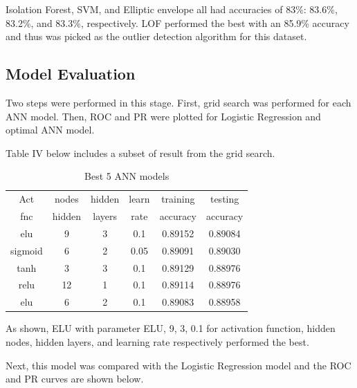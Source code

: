 \documentclass[letterpaper, 12 pt, conference]{ieeeconf}  %
\begin{document}
Isolation Forest, SVM, and Elliptic envelope all had accuracies of 83\%: 83.6\%, 83.2\%, and 83.3\%, respectively. LOF performed the best with an 85.9\% accuracy and thus was picked as the outlier detection algorithm for this dataset. 

\subsection{Model Evaluation}

Two steps were performed in this stage. First, grid search was performed for each ANN model. Then, ROC and PR were plotted for Logistic Regression and optimal ANN model.

Table IV below includes a subset of result from the grid search. 
\begin{table}[H]
        \centering
        \caption{Best 5 ANN models} 
        \begin{tabular}{cccccc}
        \toprule
        Act     & nodes  & hidden & learn & training & testing  \\
        fnc     & hidden & layers & rate  & accuracy & accuracy \\
        \midrule                  
        elu     & 9      & 3      & 0.1   & 0.89152  & 0.89084 \\
        sigmoid & 6      & 2      & 0.05  & 0.89091  & 0.89030 \\
        tanh    & 3      & 3      & 0.1   & 0.89129  & 0.88976 \\
        relu    & 12     & 1      & 0.1   & 0.89114  & 0.88976 \\
        elu     & 6      & 2      & 0.1   & 0.89083  & 0.88958 \\
        \bottomrule
        \end{tabular}
        \end{table}

\noindent As shown, ELU with parameter ELU, 9, 3, 0.1 for activation function, hidden nodes, hidden layers, and learning rate respectively performed the best.

Next, this model was compared with the Logistic Regression model and the ROC and PR curves are shown below.
\end{document}
